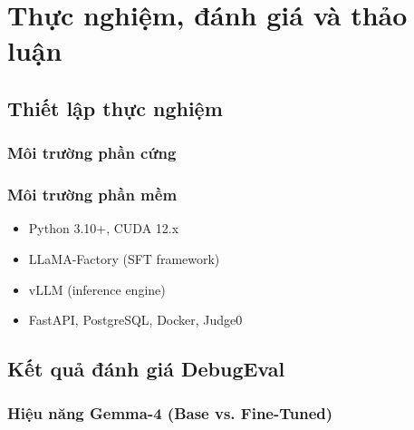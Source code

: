 \chapter{Thực nghiệm, đánh giá và thảo luận}
\label{chap:evaluation}

\section{Thiết lập thực nghiệm}

\subsection{Môi trường phần cứng}

\begin{table}[h]
\centering
\renewcommand{\arraystretch}{1.3}
\caption{Cấu hình phần cứng cho huấn luyện và inference}
\label{tab:hardware}
\end{table}

\subsection{Môi trường phần mềm}

\begin{itemize}
    \item Python 3.10+, CUDA 12.x
    \item LLaMA-Factory (SFT framework)
    \item vLLM (inference engine)
    \item FastAPI, PostgreSQL, Docker, Judge0
\end{itemize}

\section{Kết quả đánh giá DebugEval}

\subsection{Hiệu năng Gemma-4 (Base vs. Fine-Tuned)}

